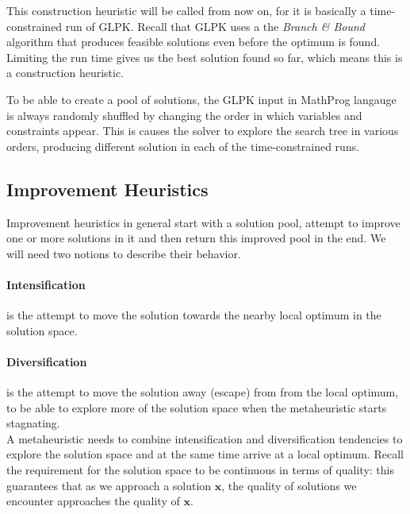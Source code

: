 This construction heuristic will be called  from now on, for it is basically a time-constrained run of GLPK. Recall that GLPK uses a the \textit{Branch \& Bound} algorithm that produces feasible solutions even before the optimum is found. Limiting the run time gives us the best solution found so far, which means this is a construction heuristic.

To be able to create a pool of solutions, the GLPK input in MathProg langauge is always randomly shuffled by changing the order in which variables and constraints appear. This is causes the solver to explore the search tree in various orders, producing different solution in each of the time-constrained runs.

\subsection{Improvement Heuristics}
\label{section-mip-ihs}


Improvement heuristics in general start with a solution pool, attempt to improve one or more solutions in it and then return this improved pool in the end. We will need two notions to describe their behavior.

\paragraph{Intensification}

is the attempt to move the solution towards the nearby local optimum in the solution space.

\paragraph{Diversification}

is the attempt to move the solution away (escape) from from the local optimum, to be able to explore more of the solution space when the metaheuristic starts stagnating.\\

A metaheuristic needs to combine intensification and diversification tendencies to explore the solution space and at the same time arrive at a local optimum. Recall the requirement for the solution space to be continuous in terms of quality: this guarantees that as we approach a solution $\mathbf{x}$, the quality of solutions we encounter approaches the quality of $\mathbf{x}$.

